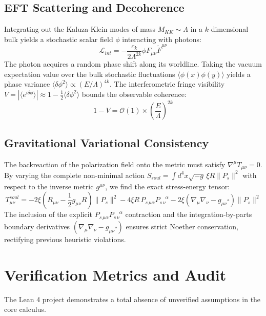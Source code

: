 \documentclass[11pt, a4paper]{article}
\begin{document}
\subsection{EFT Scattering and Decoherence}
Integrating out the Kaluza-Klein modes of mass $M_{KK} \sim \Lambda$ in a $k$-dimensional bulk yields a stochastic scalar field $\phi$ interacting with photons:
\begin{equation}
    \mathcal{L}_{int} = -\frac{c_k}{2\Lambda^{2k}} \phi F_{\mu\nu} \tilde{F}^{\mu\nu}
\end{equation}
The photon acquires a random phase shift along its worldline. Taking the vacuum expectation value over the bulk stochastic fluctuations $\langle \phi(x) \phi(y) \rangle$ yields a phase variance $\langle \delta \phi^2 \rangle \propto (E/\Lambda)^{4k}$. 
The interferometric fringe visibility $V = |\langle e^{i\delta \phi} \rangle| \approx 1 - \frac{1}{2}\langle \delta \phi^2 \rangle$ bounds the observable coherence:
\begin{equation}
    1 - V = \mathcal{O}(1) \times \left( \frac{E}{\Lambda} \right)^{2k}
\end{equation}

\subsection{Gravitational Variational Consistency}
The backreaction of the polarization field onto the metric must satisfy $\nabla^\mu T_{\mu\nu} = 0$. By varying the complete non-minimal action $S_{soul} = \int d^4x \sqrt{-g} \, \xi R \|P_s\|^2$ with respect to the inverse metric $g^{\mu\nu}$, we find the exact stress-energy tensor:
\begin{equation}
    T_{\mu\nu}^{soul} = -2\xi \left( R_{\mu\nu} - \frac{1}{2}g_{\mu\nu}R \right) \|P_s\|^2 
    - 4\xi R \, P_{s\,\mu\alpha} P_{s\,\nu}^{\;\;\;\;\alpha} 
    - 2\xi (\nabla_\mu \nabla_\nu - g_{\mu\nu}\square) \|P_s\|^2
\end{equation}
The inclusion of the explicit $P_{s\,\mu\alpha} P_{s\,\nu}^{\;\;\;\;\alpha}$ contraction and the integration-by-parts boundary derivatives $(\nabla_\mu \nabla_\nu - g_{\mu\nu}\square)$ ensures strict Noether conservation, rectifying previous heuristic violations.

\section{Verification Metrics and Audit}
The Lean 4 project demonstrates a total absence of unverified assumptions in the core calculus.
\end{document}

